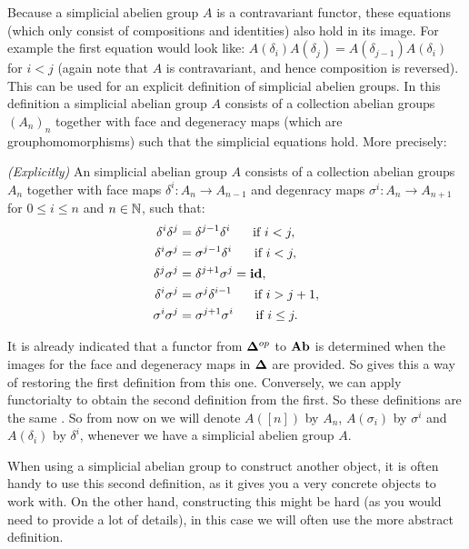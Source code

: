 Because a simplicial abelien group $A$ is a contravariant functor, these equations (which only consist of compositions and identities) also hold in its image. For example the first equation would look like: $ A(\delta_i)A(\delta_j) = A(\delta_{j-1})A(\delta_i) $ for $ i < j$ (again note that $A$ is contravariant, and hence composition is reversed). This can be used for an explicit definition of simplicial abelien groups. In this definition a simplicial abelian group $A$ consists of a collection abelian groups $(A_n)_{n}$ together with face and degeneracy maps (which are grouphomomorphisms) such that the simplicial equations hold. More precisely:

\begin{definition}
	\emph{(Explicitly)} An simplicial abelian group $A$ consists of a collection abelian groups $A_n$ together with face maps $\delta^i : A_n \to A_{n-1}$ and degenracy maps $\sigma^i : A_n \to A_{n+1}$ for $0 \leq i \leq n$ and $n \in \mathbb{N}$, such that:
	\begin{align}
		\delta^i\delta^j &= \delta^{j-1}\delta^i  \hspace{0.5cm} \text{ if } i < j,\\
		\delta^i\sigma^j &= \sigma^{j-1}\delta^i  \hspace{0.5cm} \text{ if } i < j,\\
		\delta^j\sigma^j &= \delta^{j+1}\sigma^j = \mathbf{id},\\
		\delta^i\sigma^j &= \sigma^j\delta^{i-1}  \hspace{0.5cm} \text{ if } i > j+1,\\
		\sigma^i\sigma^j &= \sigma^{j+1}\sigma^i  \hspace{0.5cm} \text{ if } i \leq j.
	\end{align}
\end{definition}

It is already indicated that a functor from $\mathbf{\Delta}^{op}$ to $\mathbf{Ab}$ is determined when the images for the face and degeneracy maps in $\mathbf{\Delta}$ are provided. So gives this a way of restoring the first definition from this one. Conversely, we can apply functorialty to obtain the second definition from the first. So these definitions are the same . So from now on we will denote $A([n])$ by $A_n$, $A(\sigma_i)$ by $\sigma^i$ and $A(\delta_i)$ by $\delta^i$, whenever we have a simplicial abelien group $A$.

When using a simplicial abelian group to construct another object, it is often handy to use this second definition, as it gives you a very concrete objects to work with. On the other hand, constructing this might be hard (as you would need to provide a lot of details), in this case we will often use the more abstract definition.


